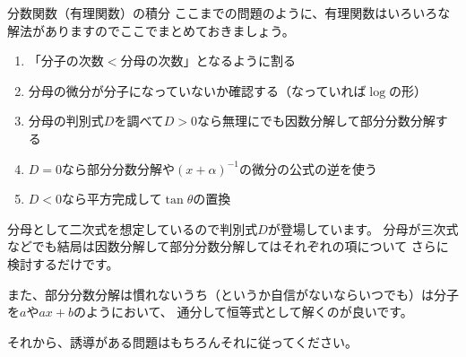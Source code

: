 \documentclass[a4paper]{ltjsarticle}
\numberwithin{equation}{section} %
\begin{document}
\begin{intprob}
\end{intprob}

\begin{itembox}[l]{分数関数（有理関数）の積分}
  ここまでの問題のように、有理関数はいろいろな解法がありますのでここでまとめておきましょう。
  \begin{enumerate}[label=\arabic*.]
    \item 「分子の次数$<$分母の次数」となるように割る
    \item 分母の微分が分子になっていないか確認する（なっていれば$\log$の形）
    \item 分母の判別式$D$を調べて$D> 0$なら無理にでも因数分解して部分分数分解する
    \item $D=0$なら部分分数分解や$(x+\alpha)^{-1}$の微分の公式の逆を使う
    \item $D<0$なら平方完成して$\tan\theta$の置換
  \end{enumerate}
  分母として二次式を想定しているので判別式$D$が登場しています。
  分母が三次式などでも結局は因数分解して部分分数分解してはそれぞれの項について
  さらに検討するだけです。

  また、部分分数分解は慣れないうち（というか自信がないならいつでも）は分子を$a$や$ax + b$のようにおいて、
  通分して恒等式として解くのが良いです。

  それから、誘導がある問題はもちろんそれに従ってください。
\end{itembox}

\begin{intprob}
\end{intprob}
\end{document}
